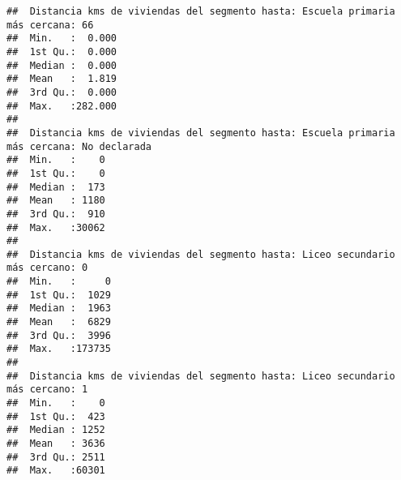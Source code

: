 \documentclass[11pt,]{article}
\begin{document}
\begin{verbatim}
##  Distancia kms de viviendas del segmento hasta: Escuela primaria más cercana: 66
##  Min.   :  0.000                                                                
##  1st Qu.:  0.000                                                                
##  Median :  0.000                                                                
##  Mean   :  1.819                                                                
##  3rd Qu.:  0.000                                                                
##  Max.   :282.000                                                                
##                                                                                 
##  Distancia kms de viviendas del segmento hasta: Escuela primaria más cercana: No declarada
##  Min.   :    0                                                                            
##  1st Qu.:    0                                                                            
##  Median :  173                                                                            
##  Mean   : 1180                                                                            
##  3rd Qu.:  910                                                                            
##  Max.   :30062                                                                            
##                                                                                           
##  Distancia kms de viviendas del segmento hasta: Liceo secundario más cercano: 0
##  Min.   :     0                                                                
##  1st Qu.:  1029                                                                
##  Median :  1963                                                                
##  Mean   :  6829                                                                
##  3rd Qu.:  3996                                                                
##  Max.   :173735                                                                
##                                                                                
##  Distancia kms de viviendas del segmento hasta: Liceo secundario más cercano: 1
##  Min.   :    0                                                                 
##  1st Qu.:  423                                                                 
##  Median : 1252                                                                 
##  Mean   : 3636                                                                 
##  3rd Qu.: 2511                                                                 
##  Max.   :60301                                                                 

\end{verbatim}
\end{document}
